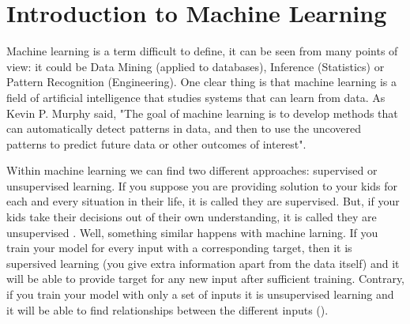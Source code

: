 
\section{Introduction to Machine Learning}
Machine learning is a term difficult to define, it can be seen from many points of view: it could be Data Mining (applied to databases), Inference (Statistics) or Pattern Recognition (Engineering). One clear thing is that machine learning is a field of artificial intelligence that studies systems that can learn from data. As Kevin P. Murphy said, "The goal of machine learning is to develop methods that can automatically detect patterns in data, and then to use the uncovered patterns to predict future data or other outcomes of interest". 

Within machine learning we can find two different approaches: supervised or unsupervised learning. If you suppose you are providing solution to your kids for each and every situation in their life, it is called they are supervised. But, if your kids take their decisions out of their own understanding, it is called they are unsupervised . Well, something similar happens with machine larning. If you train your model for every input with a corresponding target, then it is supersived learning (you give extra information apart from the data itself) and it will be able to provide target for any new input after sufficient training. Contrary, if you train your model with only a set of inputs it is unsupervised learning and it will be able to find relationships between the different inputs (\cite{sup_unsup_learning}). 

